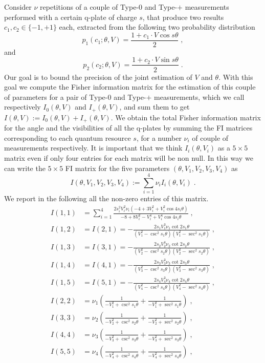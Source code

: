 \documentclass[aps, pra, 10pt, twocolumn, superscriptaddress,floatfix]{revtex4-1}
\begin{document}
Consider $\nu$ repetitions of a couple of Type-$0$ and Type-$+$ measurements~\cite{Belliardo2020} performed with a certain q-plate of charge $s$, that produce two results $c_1, c_2 \in \lbrace -1, +1 \rbrace$ each, extracted from the following two probability distribution
%
\begin{equation}
	p_1(c_1; \theta, V) = \frac{1 + c_1 \cdot V \cos s \theta}{2} \; ,
\end{equation}
%
and 
%
\begin{equation}
	p_2(c_2; \theta, V) = \frac{1 + c_2 \cdot V \sin s \theta}{2} \; .
\end{equation}
%
Our goal is to bound the precision of the joint estimation of $V$ and $\theta$. With this goal we compute the Fisher information matrix for the estimation of this couple of parameters for a pair of Type-$0$ and Type-$+$ measurements, which we call respectively $I_0 (\theta, V)$ and $I_+ (\theta, V)$, and sum them to get $I(\theta, V) := I_0 (\theta, V) + I_+ (\theta, V)$. We obtain the total Fisher information matrix for the angle and the visibilities of all the q-plates by summing the FI matrices corresponding to each quantum resource $s$, for a number $\nu_i$ of couple of measurements respectively. It is important that we think $I_i (\theta, V_i)$ as a $5 \times 5$ matrix even if only four entries for each matrix will be non null. In this way we can write the $5 \times 5$ FI matrix for the five parameters $(\theta, V_1, V_2, V_3, V_4)$ as
%
\begin{equation}
	I(\theta, V_1, V_2, V_3, V_4) := \sum_{i=1}^4 \nu_i I_i (\theta, V_i) \; .
\end{equation}
%
We report in the following all the non-zero entries of this matrix.
%
\begin{align}
		I(1, 1) &= \sum_{i=1}^4 \frac{2 s_i^2 V_i^2 \nu_i \left( -4 + 3 V_i^2 + V_i^2 \cos 4 s_i \theta \right)}{-8 + 8 V_i^2 -V_i^4 +V_i^4 \cos 4 s_i \theta} \; ,\\
		I(1, 2) &= I(2, 1) = -\frac{2 s_1 V_1^3 \nu_1 \cot 2 s_1 \theta}{(V_1^2 - \csc ^2 s_1 \theta)(V_1^2 -\sec ^2 s_1 \theta)} \; , \\
		I(1, 3) &= I(3, 1) = -\frac{2 s_2 V_2^3 \nu_2 \cot 2 s_2 \theta}{(V_2^2 - \csc ^2 s_2 \theta)(V_2^2 -\sec ^2 s_2 \theta)} \; , \\
		I(1, 4) &= I(4, 1) = -\frac{2 s_3 V_3^3 \nu_3 \cot 2 s_3 \theta}{(V_3^2 - \csc ^2 s_3 \theta)(V_3^2 -\sec ^2 s_3 \theta)} \; , \\
		I(1, 5) &= I(5, 1) = -\frac{2 s_4 V_4^3 \nu_4 \cot 2 s_4 \theta}{(V_4^2 - \csc ^2 s_4 \theta)(V_4^2 -\sec ^2 s_4 \theta)} \; , \\
		I(2, 2) &= \nu_1 \left( \frac{1}{-V_1^2 + \csc^2 s_1 \theta} + \frac{1}{-V_1^2 + \sec^2 s_1 \theta}\right) \; ,\\
		I(3, 3) &= \nu_2 \left( \frac{1}{-V_2^2 + \csc^2 s_2 \theta} + \frac{1}{-V_2^2 + \sec^2 s_2 \theta}\right) \; ,\\
		I(4, 4) &= \nu_3 \left( \frac{1}{-V_3^2 + \csc^2 s_3 \theta} + \frac{1}{-V_3^2 + \sec^2 s_3 \theta}\right) \; ,\\
		I(5, 5) &= \nu_4 \left( \frac{1}{-V_4^2 + \csc^2 s_4 \theta} + \frac{1}{-V_4^2 + \sec^2 s_4 \theta}\right) \; ,
\end{align}
%
\end{document}
